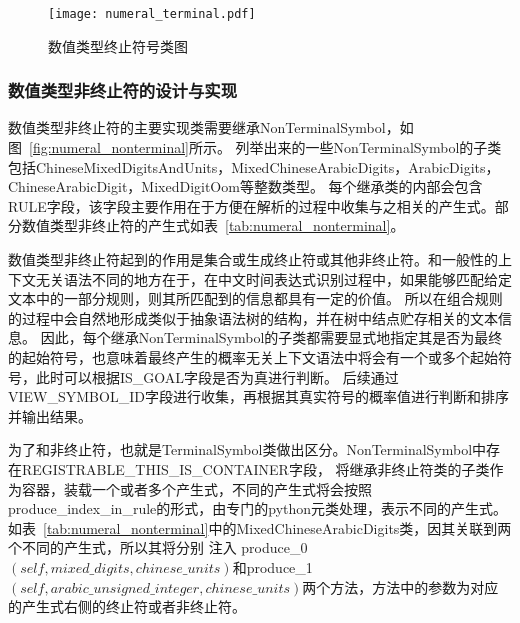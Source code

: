 \begin{figure}[h]
    \centering
    \texttt{[image: numeral\_terminal.pdf]}
    \caption{数值类型终止符号类图}
    \label{fig:numeral_terminal}
\end{figure}

\subsubsection{数值类型非终止符的设计与实现}

数值类型非终止符的主要实现类需要继承NonTerminalSymbol，如图~\ref{fig:numeral_nonterminal}所示。
列举出来的一些NonTerminalSymbol的子类包括ChineseMixedDigitsAndUnits，MixedChineseArabicDigits，ArabicDigits，ChineseArabicDigit，MixedDigitOom等整数类型。
每个继承类的内部会包含RULE字段，该字段主要作用在于方便在解析的过程中收集与之相关的产生式。部分数值类型非终止符的产生式如表~\ref{tab:numeral_nonterminal}。

数值类型非终止符起到的作用是集合或生成终止符或其他非终止符。和一般性的上下文无关语法不同的地方在于，在中文时间表达式识别过程中，如果能够匹配给定文本中的一部分规则，则其所匹配到的信息都具有一定的价值。
所以在组合规则的过程中会自然地形成类似于抽象语法树的结构，并在树中结点贮存相关的文本信息。
因此，每个继承NonTerminalSymbol的子类都需要显式地指定其是否为最终的起始符号，也意味着最终产生的概率无关上下文语法中将会有一个或多个起始符号，此时可以根据IS\_GOAL字段是否为真进行判断。
后续通过VIEW\_SYMBOL\_ID字段进行收集，再根据其真实符号的概率值进行判断和排序并输出结果。

为了和非终止符，也就是TerminalSymbol类做出区分。NonTerminalSymbol中存在REGISTRABLE\_THIS\_IS\_CONTAINER字段，
将继承非终止符类的子类作为容器，装载一个或者多个产生式，不同的产生式将会按照
produce\_index\_in\_rule的形式，由专门的python元类处理，表示不同的产生式。如表~\ref{tab:numeral_nonterminal}中的MixedChineseArabicDigits类，因其关联到两个不同的产生式，所以其将分别
注入 produce\_0$\left(self,mixed\_digits,chinese\_units\right)$和produce\_1$\left(self,arabic\_unsigned\_integer,chinese\_units\right)$两个方法，方法中的参数为对应的产生式右侧的终止符或者非终止符。

